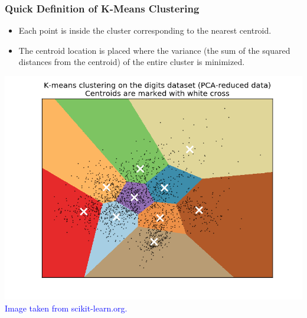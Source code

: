 \documentclass{beamer}
\begin{document}
\begin{frame}
  \frametitle{Quick Definition of K-Means Clustering}

  \begin{itemize}
  \item Each point is inside the cluster corresponding to the nearest centroid.
  \item The centroid location is placed where the variance
    (the sum of the squared distances from the centroid)
    of the entire cluster is minimized.
  \end{itemize}

  \begin{center}
    \includegraphics[width=0.6\linewidth]{kmeans.png} \\
    \vspace{-6pt}
    \textcolor{blue}{Image taken from scikit-learn.org.}
  \end{center}
\end{frame}
\end{document}
